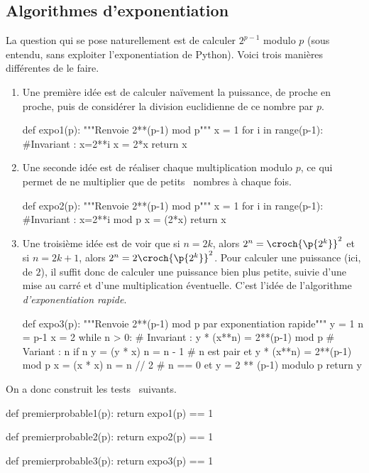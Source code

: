 \subsection{Algorithmes d'exponentiation}

La question qui se pose naturellement est de calculer $2^{p-1}$ modulo $p$ (sous entendu, sans exploiter l'exponentiation de Python). Voici trois manières différentes de le faire. 

\begin{enumerate}
  \item Une première idée est de calculer naïvement la puissance, de proche en proche, puis de considérer la division euclidienne de ce nombre par $p$.
\begin{pyverbatim}
def expo1(p):
    """Renvoie 2**(p-1) mod p"""
    x = 1
    for i in range(p-1):
    	#Invariant : x=2**i
        x = 2*x
    return x %
\end{pyverbatim}
  \item Une seconde idée est de réaliser chaque multiplication modulo $p$, ce qui permet de ne multiplier que de \og petits \fg\ nombres à chaque fois. 
\begin{pyverbatim}
def expo2(p):
    """Renvoie 2**(p-1) mod p"""
    x = 1
    for i in range(p-1):
    	#Invariant : x=2**i mod p
        x = (2*x) %
    return x  
\end{pyverbatim}
  \item Une troisième idée est de voir que si $n = 2k$, alors $2^n = \croch{\p{2^k}}^2$ et si $n = 2k+1$, alors $2^n = 2\croch{\p{2^k}}^2$. 
  Pour calculer une puissance (ici, de $2$), il suffit donc de calculer une puissance bien plus petite, suivie d'une mise au carré et d'une multiplication éventuelle. C'est l'idée de l'algorithme \emph{d'exponentiation rapide}.
\begin{pyverbatim}
def expo3(p):
    """Renvoie 2**(p-1) mod p par exponentiation rapide"""
    y = 1
    n = p-1
    x = 2
    while n > 0:
        # Invariant : y * (x**n) = 2**(p-1) mod p
        # Variant : n
        if n %
            y = (y * x) %
            n = n - 1
        # n est pair et y * (x**n) = 2**(p-1) mod p
        x = (x * x) %
        n = n // 2
    # n == 0 et y = 2 ** (p-1) modulo p
    return y
\end{pyverbatim}
\end{enumerate}

On a donc construit les \og tests \fg\ suivants.

\begin{pyverbatim}
def premierprobable1(p):
    return expo1(p) == 1

def premierprobable2(p):
    return expo2(p) == 1

def premierprobable3(p):
    return expo3(p) == 1
\end{pyverbatim}

